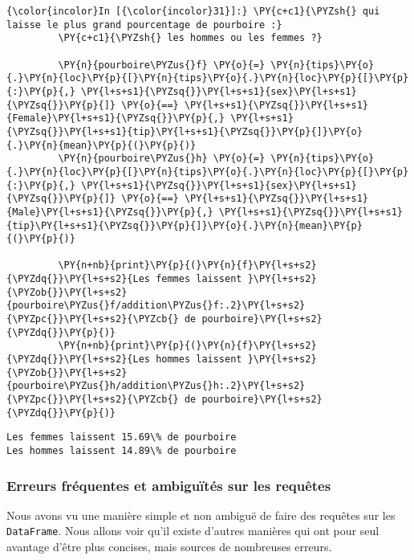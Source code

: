     \begin{Verbatim}[commandchars=\\\{\}]
{\color{incolor}In [{\color{incolor}31}]:} \PY{c+c1}{\PYZsh{} qui laisse le plus grand pourcentage de pourboire :}
         \PY{c+c1}{\PYZsh{} les hommes ou les femmes ?}
         
         \PY{n}{pourboire\PYZus{}f} \PY{o}{=} \PY{n}{tips}\PY{o}{.}\PY{n}{loc}\PY{p}{[}\PY{n}{tips}\PY{o}{.}\PY{n}{loc}\PY{p}{[}\PY{p}{:}\PY{p}{,} \PY{l+s+s1}{\PYZsq{}}\PY{l+s+s1}{sex}\PY{l+s+s1}{\PYZsq{}}\PY{p}{]} \PY{o}{==} \PY{l+s+s1}{\PYZsq{}}\PY{l+s+s1}{Female}\PY{l+s+s1}{\PYZsq{}}\PY{p}{,} \PY{l+s+s1}{\PYZsq{}}\PY{l+s+s1}{tip}\PY{l+s+s1}{\PYZsq{}}\PY{p}{]}\PY{o}{.}\PY{n}{mean}\PY{p}{(}\PY{p}{)}
         \PY{n}{pourboire\PYZus{}h} \PY{o}{=} \PY{n}{tips}\PY{o}{.}\PY{n}{loc}\PY{p}{[}\PY{n}{tips}\PY{o}{.}\PY{n}{loc}\PY{p}{[}\PY{p}{:}\PY{p}{,} \PY{l+s+s1}{\PYZsq{}}\PY{l+s+s1}{sex}\PY{l+s+s1}{\PYZsq{}}\PY{p}{]} \PY{o}{==} \PY{l+s+s1}{\PYZsq{}}\PY{l+s+s1}{Male}\PY{l+s+s1}{\PYZsq{}}\PY{p}{,} \PY{l+s+s1}{\PYZsq{}}\PY{l+s+s1}{tip}\PY{l+s+s1}{\PYZsq{}}\PY{p}{]}\PY{o}{.}\PY{n}{mean}\PY{p}{(}\PY{p}{)}
         
         \PY{n+nb}{print}\PY{p}{(}\PY{n}{f}\PY{l+s+s2}{\PYZdq{}}\PY{l+s+s2}{Les femmes laissent }\PY{l+s+s2}{\PYZob{}}\PY{l+s+s2}{pourboire\PYZus{}f/addition\PYZus{}f:.2}\PY{l+s+s2}{\PYZpc{}}\PY{l+s+s2}{\PYZcb{} de pourboire}\PY{l+s+s2}{\PYZdq{}}\PY{p}{)}
         \PY{n+nb}{print}\PY{p}{(}\PY{n}{f}\PY{l+s+s2}{\PYZdq{}}\PY{l+s+s2}{Les hommes laissent }\PY{l+s+s2}{\PYZob{}}\PY{l+s+s2}{pourboire\PYZus{}h/addition\PYZus{}h:.2}\PY{l+s+s2}{\PYZpc{}}\PY{l+s+s2}{\PYZcb{} de pourboire}\PY{l+s+s2}{\PYZdq{}}\PY{p}{)}
\end{Verbatim}


    \begin{Verbatim}[commandchars=\\\{\}]
Les femmes laissent 15.69\% de pourboire
Les hommes laissent 14.89\% de pourboire

    \end{Verbatim}

    \hypertarget{erreurs-fruxe9quentes-et-ambiguuxeftuxe9s-sur-les-requuxeates}{%
\subsubsection{Erreurs fréquentes et ambiguïtés sur les
requêtes}\label{erreurs-fruxe9quentes-et-ambiguuxeftuxe9s-sur-les-requuxeates}}

    Nous avons vu une manière simple et non ambiguë de faire des requêtes
sur les \texttt{DataFrame}. Nous allons voir qu'il existe d'autres
manières qui ont pour seul avantage d'être plus concises, mais sources
de nombreuses erreurs.

